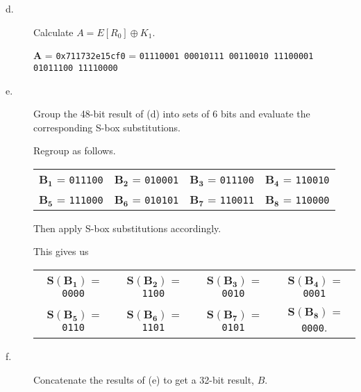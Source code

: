 \documentclass[../hw_sols.tex]{subfiles}
\begin{document}
\begin{description}
\item[d.] Calculate $A = E[R_0] \oplus K_1$.

\begin{solution}
	$\mathbf{A}$ 
	= \verb|0x711732e15cf0| 
	= \verb|01110001 00010111 00110010 11100001 01011100 11110000|
\end{solution}


\item[e.] Group the 48-bit result of (d) into sets of 6 bits and evaluate the 
corresponding S-box substitutions.

\begin{solution}

Regroup as follows.
	\begin{center}
	\begin{tabular}{ c c c c }
		$\mathbf{B_1}$ = \verb|011100| & $\mathbf{B_2}$ = \verb|010001| &
		$\mathbf{B_3}$ = \verb|011100| & $\mathbf{B_4}$ = \verb|110010| \\
		$\mathbf{B_5}$ = \verb|111000| & $\mathbf{B_6}$ = \verb|010101| &
		$\mathbf{B_7}$ = \verb|110011| & $\mathbf{B_8}$ = \verb|110000|
	\end{tabular}
	\end{center}

Then apply S-box substitutions accordingly.



This gives us
	\begin{center}
	\begin{tabular}{ c c c c }
		$\mathbf{S(B_1)}$ = \verb|0000| & $\mathbf{S(B_2)}$ = \verb|1100| &  
		$\mathbf{S(B_3)}$ = \verb|0010| & $\mathbf{S(B_4)}$ = \verb|0001| \\
		$\mathbf{S(B_5)}$ = \verb|0110| & $\mathbf{S(B_6)}$ = \verb|1101| &
		$\mathbf{S(B_7)}$ = \verb|0101| & $\mathbf{S(B_8)}$ = \verb|0000|.
	\end{tabular}
	\end{center}

\end{solution}


\item[f.] Concatenate the results of (e) to get a 32-bit result, $B$.

\begin{solution}


\end{solution}
\end{description}
\end{document}
